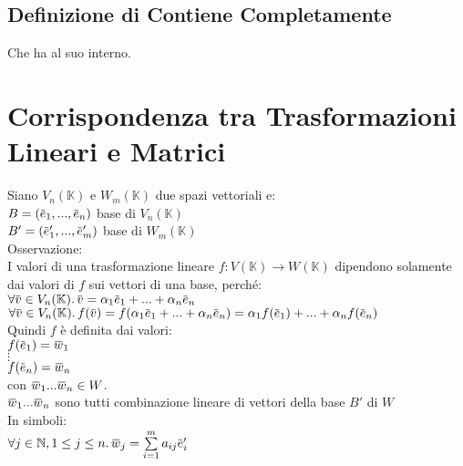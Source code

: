 \documentclass[a4paper, twoside, italian, 11pt]{book}
\newcommand{\overbar}[1] {\mkern 1.5mu\overline{\mkern-1.5mu#1\mkern-1.5mu}\mkern 1.5mu}
\newcommand{\N}{\mathbb N}
\newcommand{\K}{\mathbb K}
\begin{document}
\subsection{Definizione di Contiene Completamente}
Che ha al suo interno.



\section{Corrispondenza tra Trasformazioni Lineari e Matrici}

Siano $V_n(\K)$ e $W_m(\K)$ due spazi vettoriali e: \\

$B = (\overbar e_1, ..., \overbar e_n)$ base di $V_n(\K)$ \\
\indent
$B' = (\overbar e'_1, ..., \overbar e'_m)$ base di $W_m(\K)$ \\

\noindent
Osservazione: \\
I valori di una trasformazione lineare $f : V(\K) \rightarrow W(\K)$ dipendono solamente dai valori di $f$ sui vettori di una base, perché: \\

$\forall \overbar v \in V_n(\K) \ldotp \overbar v = \alpha_1 \overbar e_1 + ... + \alpha_n \overbar e_n$ \\

$\forall \overbar v \in V_n(\K) \ldotp f(\overbar v) = f(\alpha_1 \overbar e_1 + ... + \alpha_n \overbar e_n) = \alpha_1 f(\overbar e_1) + ... + \alpha_n f(\overbar e_n)$ \\

\noindent
Quindi $f$ è definita dai valori: \\

$f(\overbar e_1) = \overbar w_1$ \\
\indent
$\vdots$ \\
\indent
$f(\overbar e_n) = \overbar w_n$ \\

\noindent
con $\overbar w_1 ... \overbar w_n \in W$. \\

\noindent
$\overbar w_1 ... \overbar w_n$ sono tutti combinazione lineare di vettori della base $B'$ di $W$ \\

\noindent
In simboli: \\

$\forall j \in \N, 1 \leq j \leq n \ldotp \overbar w_j = \sum\limits_{i = 1}^{m} a_{ij} \overbar e'_i$ \\
\end{document}
